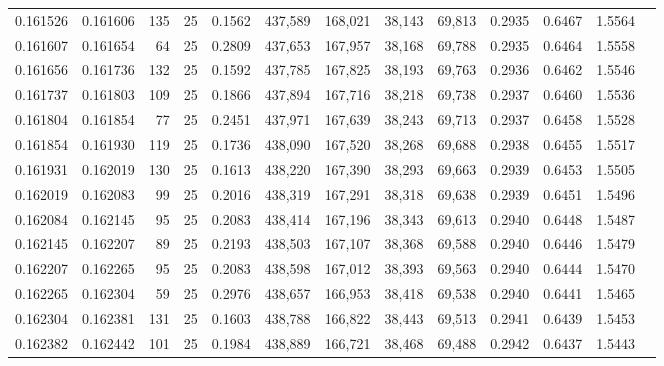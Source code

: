 \begin{tabular}{rrrrrrrrrrrrr}
0.161526 & 0.161606 &   135 &  25 &                                     0.1562 & 437,589 & 168,021 &  38,143 &  69,813 & 0.2935 & 0.6467 & 1.5564 \\
0.161607 & 0.161654 &    64 &  25 &                                     0.2809 & 437,653 & 167,957 &  38,168 &  69,788 & 0.2935 & 0.6464 & 1.5558 \\
0.161656 & 0.161736 &   132 &  25 &                                     0.1592 & 437,785 & 167,825 &  38,193 &  69,763 & 0.2936 & 0.6462 & 1.5546 \\
0.161737 & 0.161803 &   109 &  25 &                                     0.1866 & 437,894 & 167,716 &  38,218 &  69,738 & 0.2937 & 0.6460 & 1.5536 \\
0.161804 & 0.161854 &    77 &  25 &                                     0.2451 & 437,971 & 167,639 &  38,243 &  69,713 & 0.2937 & 0.6458 & 1.5528 \\
0.161854 & 0.161930 &   119 &  25 &                                     0.1736 & 438,090 & 167,520 &  38,268 &  69,688 & 0.2938 & 0.6455 & 1.5517 \\
0.161931 & 0.162019 &   130 &  25 &                                     0.1613 & 438,220 & 167,390 &  38,293 &  69,663 & 0.2939 & 0.6453 & 1.5505 \\
0.162019 & 0.162083 &    99 &  25 &                                     0.2016 & 438,319 & 167,291 &  38,318 &  69,638 & 0.2939 & 0.6451 & 1.5496 \\
0.162084 & 0.162145 &    95 &  25 &                                     0.2083 & 438,414 & 167,196 &  38,343 &  69,613 & 0.2940 & 0.6448 & 1.5487 \\
0.162145 & 0.162207 &    89 &  25 &                                     0.2193 & 438,503 & 167,107 &  38,368 &  69,588 & 0.2940 & 0.6446 & 1.5479 \\
0.162207 & 0.162265 &    95 &  25 &                                     0.2083 & 438,598 & 167,012 &  38,393 &  69,563 & 0.2940 & 0.6444 & 1.5470 \\
0.162265 & 0.162304 &    59 &  25 &                                     0.2976 & 438,657 & 166,953 &  38,418 &  69,538 & 0.2940 & 0.6441 & 1.5465 \\
0.162304 & 0.162381 &   131 &  25 &                                     0.1603 & 438,788 & 166,822 &  38,443 &  69,513 & 0.2941 & 0.6439 & 1.5453 \\
0.162382 & 0.162442 &   101 &  25 &                                     0.1984 & 438,889 & 166,721 &  38,468 &  69,488 & 0.2942 & 0.6437 & 1.5443 \\

\end{tabular}
